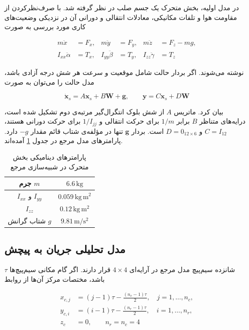 در مدل اولیه، بخش متحرک یک جسم صلب در نظر گرفته شد. با صرف‌نظرکردن از مقاومت هوا و تلفات مکانیکی، معادلات انتقالی و دورانی آن در نزدیکی وضعیت‌های کاری مورد بررسی به صورت

\begin{align}
	m\ddot{x}&=F_x, & m\ddot{y}&=F_y, & m\ddot{z}&=F_z-mg,\label{eq:method-translational-eom}\\
	I_{xx}\ddot{\alpha}&=T_x, & I_{yy}\ddot{\beta}&=T_y, & I_{zz}\ddot{\gamma}&=T_z
	\label{eq:method-rotational-eom}
\end{align}

نوشته می‌شوند. اگر بردار حالت شامل موقعیت و سرعت هر شش درجه آزادی باشد، مدل حالت را می‌توان به صورت

\begin{equation}
	\dot{\mathbf x}_s=A\mathbf x_s+B\mathbf W+\mathbf g,
	\qquad
	\mathbf y=C\mathbf x_s+D\mathbf W
	\label{eq:method-state-dynamics}
\end{equation}

بیان کرد. ماتریس $A$ از شش بلوک انتگرال‌گیر مرتبه‌ی دوم تشکیل شده است، درایه‌های متناظر $B$ برابر $1/m$ برای حرکت انتقالی و $1/I_{jj}$ برای حرکت دورانی هستند، $C=I_{12}$ و $D=0_{12\times6}$ است. بردار $\mathbf g$ تنها در مؤلفه‌ی شتاب قائم مقدار $-g$ دارد. پارامترهای مدل مرجع در جدول \ref{tab:method-reference-dynamics} آمده‌اند.

\begin{table}[htbp]
	\centering
	\caption{پارامترهای دینامیکی بخش متحرک در شبیه‌سازی مرجع}
	\label{tab:method-reference-dynamics}
	\begin{tabular}{|c|c|}
		\hline
		جرم $m$ & $6.6\,\mathrm{kg}$\\ \hline
		$I_{xx}$ و $I_{yy}$ & $0.059\,\mathrm{kg\,m^2}$\\ \hline
		$I_{zz}$ & $0.12\,\mathrm{kg\,m^2}$\\ \hline
		شتاب گرانش $g$ & $9.81\,\mathrm{m/s^2}$\\ \hline
	\end{tabular}
\end{table}

\subsection{مدل تحلیلی جریان به پیچش}
\label{subsec:method-stator-model}

شانزده سیم‌پیچ مدل مرجع در آرایه‌ای $4\times4$ قرار دارند. اگر گام مکانی سیم‌پیچ‌ها $\tau$ باشد، مختصات مرکز آن‌ها از روابط

\begin{align}
	x_{c,j}&=(j-1)\tau-\frac{(n_c-1)\tau}{2},\quad j=1,\ldots,n_c,\label{eq:method-xcenter}\\
	y_{c,i}&=(i-1)\tau-\frac{(n_r-1)\tau}{2},\quad i=1,\ldots,n_r,\label{eq:method-ycenter}\\
	z_c&=0,\qquad n_r=n_c=4
	\label{eq:method-grid-params}
\end{align}

